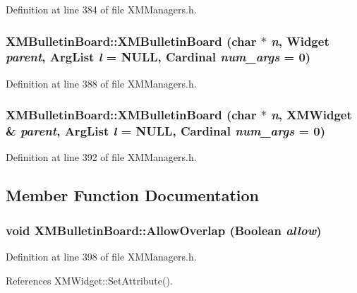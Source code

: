 Definition at line 384 of file XMManagers.h.
\subsubsection{\setlength{\rightskip}{0pt plus 5cm}XMBulletin\-Board::XMBulletin\-Board (char $\ast$ {\em n}, Widget {\em parent}, Arg\-List {\em l} = NULL, Cardinal {\em num\_\-args} = 0)\hspace{0.3cm}{\tt  [inline]}}\label{classXMBulletinBoard_a3}




Definition at line 388 of file XMManagers.h.
\subsubsection{\setlength{\rightskip}{0pt plus 5cm}XMBulletin\-Board::XMBulletin\-Board (char $\ast$ {\em n}, {\bf XMWidget} \& {\em parent}, Arg\-List {\em l} = NULL, Cardinal {\em num\_\-args} = 0)\hspace{0.3cm}{\tt  [inline]}}\label{classXMBulletinBoard_a4}




Definition at line 392 of file XMManagers.h.

\subsection{Member Function Documentation}
\subsubsection{\setlength{\rightskip}{0pt plus 5cm}void XMBulletin\-Board::Allow\-Overlap (Boolean {\em allow})\hspace{0.3cm}{\tt  [inline]}}\label{classXMBulletinBoard_a5}




Definition at line 398 of file XMManagers.h.

References XMWidget::Set\-Attribute().
